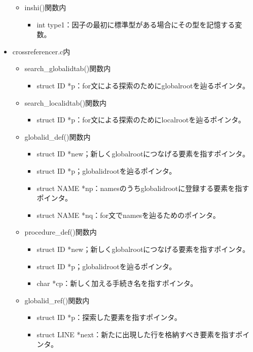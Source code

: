 \documentclass{jarticle}
\begin{document}
\begin{itemize}
\begin{itemize}
\begin{itemize}
    \end{itemize}
    \item inshi()関数内
    \begin{itemize}
      \item int type1：因子の最初に標準型がある場合にその型を記憶する変数。
    \end{itemize}
  \end{itemize}
  \item crossreferencer.c内
  \begin{itemize}
    \item search\_globalidtab()関数内
    \begin{itemize}
      \item struct ID *p：for文による探索のためにglobalrootを辿るポインタ。
    \end{itemize}
    \item search\_localidtab()関数内
    \begin{itemize}
      \item struct ID *p：for文による探索のためにlocalrootを辿るポインタ。
    \end{itemize}
    \item globalid\_def()関数内
    \begin{itemize}
      \item struct ID *new；新しくglobalrootにつなげる要素を指すポインタ。
      \item struct ID *p；globalidrootを辿るポインタ。
      \item struct NAME *np：namesのうちglobalidrootに登録する要素を指すポインタ。
      \item struct NAME *nq：for文でnamesを辿るためのポインタ。
    \end{itemize}
    \item procedure\_def()関数内
    \begin{itemize}
      \item struct ID *new；新しくglobalrootにつなげる要素を指すポインタ。
      \item struct ID *p；globalidrootを辿るポインタ。
      \item char *cp：新しく加える手続き名を指すポインタ。
    \end{itemize}
    \item globalid\_ref()関数内
    \begin{itemize}
      \item struct ID *p：探索した要素を指すポインタ。
      \item struct LINE *next：新たに出現した行を格納すべき要素を指すポインタ。

\end{itemize}
\end{itemize}
\end{itemize}
\end{document}
